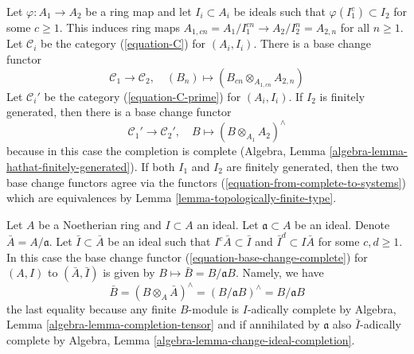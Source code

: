 \begin{remark}
\label{remark-base-change}
Let $\varphi : A_1 \to A_2$ be a ring map and let
$I_i \subset A_i$ be ideals such that $\varphi(I_1^c) \subset I_2$
for some $c \geq 1$. This induces ring maps
$A_{1, cn} = A_1/I_1^{cn} \to A_2/I_2^n = A_{2, n}$ for all $n \geq 1$.
Let $\mathcal{C}_i$ be the category (\ref{equation-C}) for $(A_i, I_i)$.
There is a base change functor
\begin{equation}
\label{equation-base-change-systems}
\mathcal{C}_1 \longrightarrow \mathcal{C}_2,\quad
(B_n) \longmapsto (B_{cn} \otimes_{A_{1, cn}} A_{2, n})
\end{equation}
Let $\mathcal{C}_i'$ be the category (\ref{equation-C-prime}) for $(A_i, I_i)$.
If $I_2$ is finitely generated, then there is a base change functor
\begin{equation}
\label{equation-base-change-complete}
\mathcal{C}_1' \longrightarrow \mathcal{C}_2',\quad
B \longmapsto (B \otimes_{A_1} A_2)^\wedge
\end{equation}
because in this case the completion is complete
(Algebra, Lemma \ref{algebra-lemma-hathat-finitely-generated}).
If both $I_1$ and $I_2$ are finitely generated, then
the two base change functors agree via the functors
(\ref{equation-from-complete-to-systems})
which are equivalences by Lemma \ref{lemma-topologically-finite-type}.
\end{remark}

\begin{remark}
\label{remark-take-bar}
Let $A$ be a Noetherian ring and $I \subset A$ an ideal.
Let $\mathfrak a \subset A$ be an ideal. Denote $\bar A = A/\mathfrak a$.
Let $\bar I \subset \bar A$ be an ideal such that
$I^c \bar A \subset \bar I$ and $\bar I^d \subset I\bar A$
for some $c, d \geq 1$. In this case the base change functor
(\ref{equation-base-change-complete}) for $(A, I)$ to $(\bar A, \bar I)$
is given by $B \mapsto \bar B = B/\mathfrak aB$. Namely, we have
\begin{equation}
\label{equation-base-change-to-closed}
\bar B = (B \otimes_A \bar A)^\wedge = (B/\mathfrak a B)^\wedge =
B/\mathfrak a B
\end{equation}
the last equality because any finite $B$-module is $I$-adically complete by
Algebra, Lemma \ref{algebra-lemma-completion-tensor}
and if annihilated by $\mathfrak a$ also $\bar I$-adically complete by
Algebra, Lemma \ref{algebra-lemma-change-ideal-completion}.
\end{remark}







